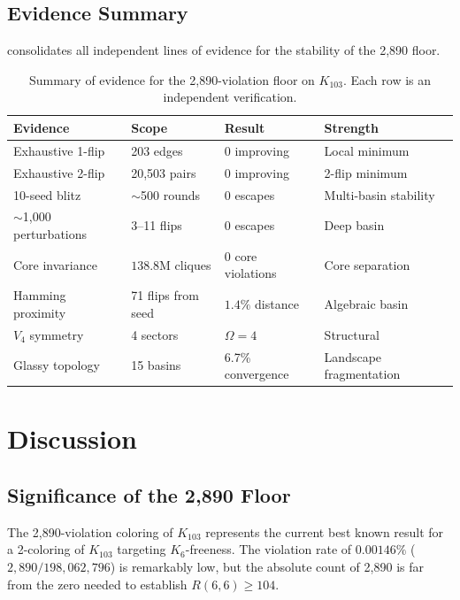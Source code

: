 \documentclass[11pt,a4paper]{article}
\theoremstyle{plain}
\theoremstyle{remark}
\begin{document}
\subsection{Evidence Summary}

 consolidates all independent lines of evidence
for the stability of the 2{,}890 floor.

\begin{table}[H]
\centering
\caption{Summary of evidence for the 2{,}890-violation floor on
  $K_{103}$. Each row is an independent verification.}
\label{tab:evidence}
\small
\begin{tabular}{@{}llll@{}}
\toprule
\textbf{Evidence} & \textbf{Scope} & \textbf{Result} & \textbf{Strength} \\
\midrule
Exhaustive 1-flip & 203 edges & 0 improving & Local minimum \\
Exhaustive 2-flip & 20{,}503 pairs & 0 improving & 2-flip minimum \\
10-seed blitz & $\sim$500 rounds & 0 escapes & Multi-basin stability \\
$\sim$1{,}000 perturbations & 3--11 flips & 0 escapes & Deep basin \\
Core invariance & $138.8$M cliques & 0 core violations & Core separation \\
Hamming proximity & 71 flips from seed & $1.4\%$ distance & Algebraic basin \\
$V_4$ symmetry & 4 sectors & $\Omega = 4$ & Structural \\
Glassy topology & 15 basins & 6.7\% convergence & Landscape fragmentation \\
\bottomrule
\end{tabular}
\end{table}

\section{Discussion}
\label{sec:discussion}

\subsection{Significance of the 2{,}890 Floor}

The 2{,}890-violation coloring of $K_{103}$ represents the current
best known result for a 2-coloring of $K_{103}$ targeting
$K_6$-freeness. The violation rate of $0.00146\%$
($2{,}890 / 198{,}062{,}796$) is remarkably low, but the absolute
count of 2{,}890 is far from the zero needed to establish
$R(6,6) \geq 104$.
\end{document}
